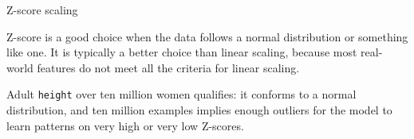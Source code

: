 \begin{frame}[fragile]{Z-score scaling}
  \begin{withmargin}
    \begin{tdmargin}
      Z-score is a good choice when the data follows a normal distribution or
      something like one. It is typically a better choice than linear scaling,
      because most real-world features do not meet all the criteria for linear
      scaling.
      \par\medskip
      Adult \texttt{height} over ten million women qualifies: it conforms to a
      normal distribution, and ten million examples implies enough outliers for
      the model to learn patterns on very high or very low Z-scores.
    \end{tdmargin}
  \end{withmargin}
\end{frame}

